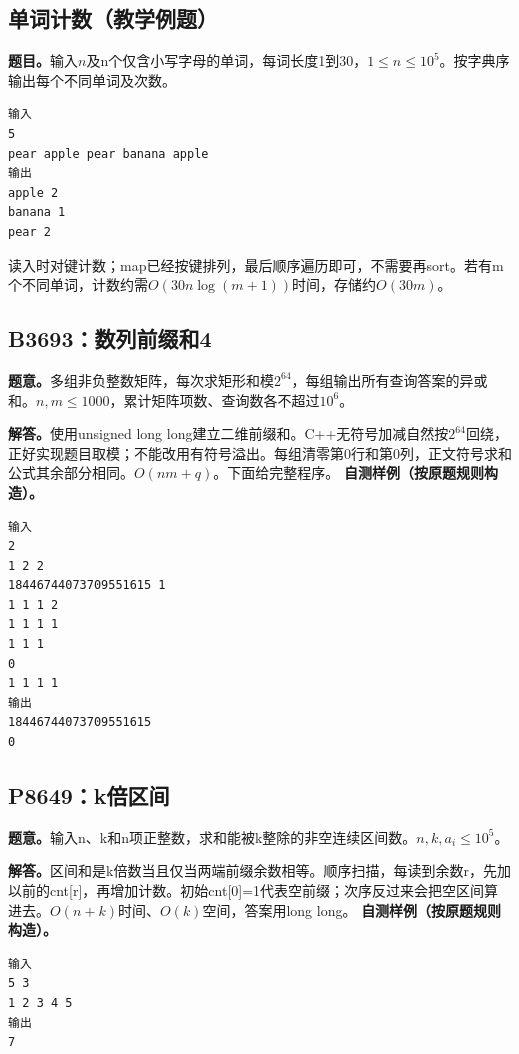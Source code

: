 \subsection{单词计数（教学例题）}

\noindent\textbf{题目。}输入$n$及n个仅含小写字母的单词，每词长度1到30，$1\le n\le10^5$。按字典序输出每个不同单词及次数。
\begin{verbatim}
输入
5
pear apple pear banana apple
输出
apple 2
banana 1
pear 2
\end{verbatim}
读入时对键计数；map已经按键排列，最后顺序遍历即可，不需要再sort。若有m个不同单词，计数约需$O(30n\log(m+1))$时间，存储约$O(30m)$。
\subsection{B3693：数列前缀和4}


\noindent\textbf{题意。}多组非负整数矩阵，每次求矩形和模$2^{64}$，每组输出所有查询答案的异或和。$n,m\le1000$，累计矩阵项数、查询数各不超过$10^6$。

\noindent\textbf{解答。}使用unsigned long long建立二维前缀和。C++无符号加减自然按$2^{64}$回绕，正好实现题目取模；不能改用有符号溢出。每组清零第0行和第0列，正文符号求和公式其余部分相同。$O(nm+q)$。下面给完整程序。
\textbf{自测样例（按原题规则构造）。}
\begin{verbatim}
输入
2
1 2 2
18446744073709551615 1
1 1 1 2
1 1 1 1
1 1 1
0
1 1 1 1
输出
18446744073709551615
0
\end{verbatim}

\subsection{P8649：k倍区间}


\noindent\textbf{题意。}输入n、k和n项正整数，求和能被k整除的非空连续区间数。$n,k,a_i\le10^5$。

\noindent\textbf{解答。}区间和是k倍数当且仅当两端前缀余数相等。顺序扫描，每读到余数r，先加以前的cnt[r]，再增加计数。初始cnt[0]=1代表空前缀；次序反过来会把空区间算进去。$O(n+k)$时间、$O(k)$空间，答案用long long。
\textbf{自测样例（按原题规则构造）。}
\begin{verbatim}
输入
5 3
1 2 3 4 5
输出
7
\end{verbatim}

